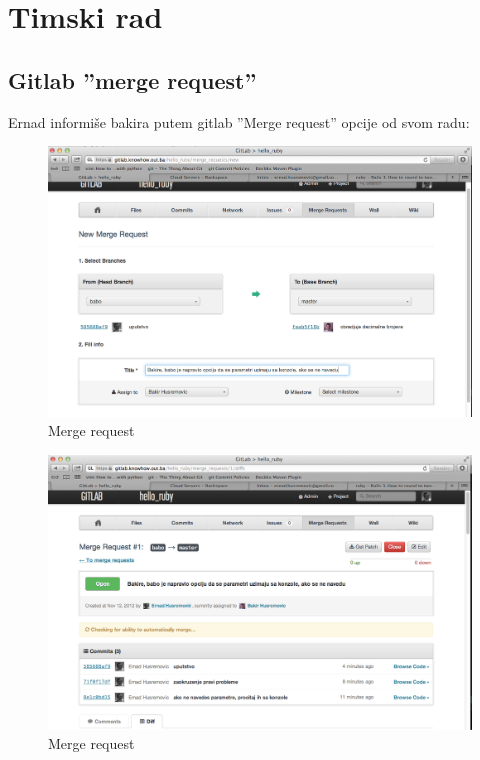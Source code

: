 \documentclass[times, utf8, seminar]{fit}
\begin{document}
\section{Timski rad}
\subsection{Gitlab ''merge request''}

Ernad informiše bakira putem gitlab ''Merge request'' opcije od svom radu:

\begin{figure}[H]
\centering
\includegraphics[width=14cm]{img/gitlab_merge_request.png}
\caption{Merge request}
\end{figure}

\begin{figure}[H]
\centering
\includegraphics[width=14cm]{img/gitlab_merge_request_2.png}
\caption{Merge request}
\end{figure}
\end{document}
